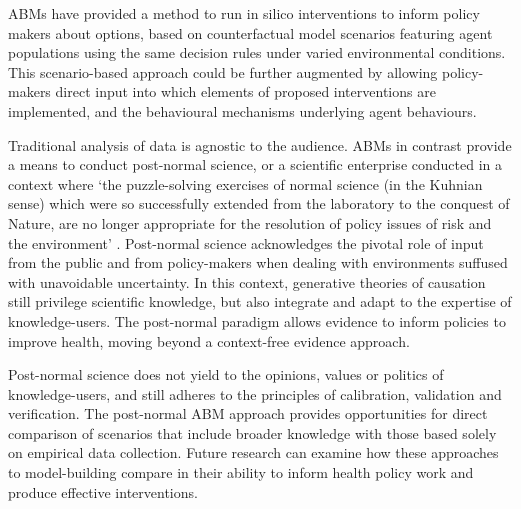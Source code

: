 \documentclass[review]{elsarticle}
\begin{document}
ABMs have provided a method to run in silico interventions to inform policy makers about options, based on counterfactual model scenarios featuring agent populations using the same decision rules under varied environmental conditions.  This scenario-based approach could be further augmented by allowing policy-makers direct input into which elements of proposed interventions are implemented, and the behavioural mechanisms underlying agent behaviours.

Traditional analysis of data is agnostic to the audience. ABMs in contrast provide a means to conduct post-normal science, or a scientific enterprise conducted in a context where `the puzzle-solving exercises of normal science (in the Kuhnian sense)  which were so successfully extended from the laboratory to the conquest of Nature, are no longer appropriate for the resolution of policy issues of risk and the environment' \citep[][p. 750]{funtowicz1993}.  Post-normal science acknowledges the pivotal role of input from the public and from policy-makers when dealing with environments suffused with unavoidable uncertainty.  In this context, generative theories of causation still privilege scientific knowledge, but also integrate and adapt to the expertise of knowledge-users.  The post-normal paradigm allows evidence to inform policies to improve health, moving beyond a context-free evidence approach.

Post-normal science does not yield to the opinions, values or politics of knowledge-users, and still adheres to the principles of calibration, validation and verification.  The post-normal ABM approach provides opportunities for direct comparison of scenarios that include broader knowledge with those based solely on empirical data collection.  Future research can examine how these approaches to model-building compare in their ability to inform health policy work and produce effective interventions.
\end{document}
